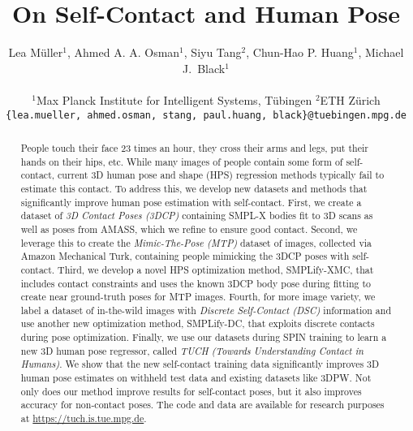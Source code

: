 \documentclass[final]{cvpr}
\newcommand{\smplifyxmc}{\mbox{SMPLify-XMC}\xspace}
\newcommand{\smplifyxdc}{\mbox{SMPLify-DC}\xspace}
\theoremstyle{definition}
\begin{document}
	
\title{On Self-Contact and Human Pose}
	\author{Lea M\"uller$^1$, Ahmed A. A. Osman$^1$, Siyu Tang$^2$, Chun-Hao P. Huang$^1$, Michael J.~Black$^1$\\
		\\
		$^1$Max Planck Institute for Intelligent Systems, T\"ubingen \hspace{0.25in} $^2$ETH Z\"urich\\
		{\tt\small \{lea.mueller,  ahmed.osman, stang, paul.huang, black\}@tuebingen.mpg.de}
	}
		
	\maketitle
	
	
\begin{abstract}
People touch their face 23 times an hour, they cross their arms and legs, put their hands on their hips, etc.  
While many images of people contain some form of self-contact, current 3D human pose and shape (HPS) regression methods typically fail to estimate this contact.
To address this, we develop new datasets and methods that significantly improve human pose estimation with self-contact.
First, we create a dataset of {\em 3D Contact Poses (3DCP)} containing SMPL-X bodies fit to 3D scans as well as poses from AMASS, which we refine to ensure good contact.
Second, we leverage this to create the {\em Mimic-The-Pose (MTP)} dataset of images, collected via Amazon Mechanical Turk, containing people mimicking the 3DCP poses with self-contact.
Third, we develop a novel HPS optimization method, \smplifyxmc, 
that includes contact constraints and uses the known 3DCP body pose during fitting to create near ground-truth poses for MTP images. 
Fourth, for more image variety, we label a dataset of in-the-wild images with {\em Discrete Self-Contact (DSC)} information and use another new optimization method, \smplifyxdc, that exploits discrete contacts during pose optimization.
Finally, we use our datasets during SPIN training to learn a new 3D human pose regressor, called {\em TUCH (Towards
Understanding Contact in Humans)}.
We show that the new self-contact training data significantly improves 3D human pose estimates on withheld test data and existing datasets like 3DPW.  Not only does our method improve results for self-contact poses, but it also improves accuracy for non-contact poses.
The code and data are available for research purposes at \url{https://tuch.is.tue.mpg.de}.

\end{abstract} 	
\end{document}
